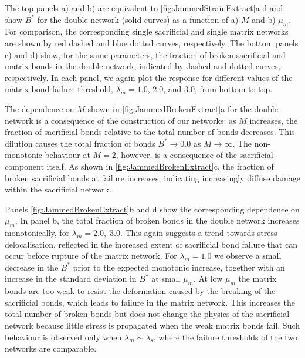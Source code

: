 The top panels a) and b) are equivalent to \cref{fig:JammedStrainExtract}a-d and show $B^*$ for the double network (solid curves) as a function of a) $M$ and b) $\mu_m$. For comparison, the corresponding single sacrificial and single matrix networks are shown by red dashed and blue dotted curves, respectively. The bottom panels c) and d) show, for the same parameters, the fraction of broken sacrificial and matrix bonds in the double network, indicated by dashed and dotted curves, respectively. In each panel, we again plot the response for different values of the matrix bond failure threshold, $\lambda_m=1.0$, $2.0$, and $3.0$, from bottom to top. 

The dependence on $M$ shown in \cref{fig:JammedBrokenExtract}a for the double network is a consequence of the construction of our networks: as $M$ increases, the fraction of sacrificial bonds relative to the total number of bonds decreases. This dilution causes the total fraction of bonds $ B^* \to 0.0$ as $M\to\infty$. The non-monotonic behaviour at $M=2$, however, is a consequence of the sacrificial component itself. As shown in \cref{fig:JammedBrokenExtract}c, the fraction of broken sacrificial bonds at failure increases, indicating increasingly diffuse damage within the sacrificial network.

Panels \cref{fig:JammedBrokenExtract}b and d show the corresponding dependence on $\mu_m$. In panel b, the total fraction of broken bonds in the double network increases monotonically, for $\lambda_m = 2.0, \; 3.0$. This again suggests a trend towards stress delocalisation, reflected in the increased extent of sacrificial bond failure that can occur before rupture of the matrix network. For $\lambda_m =1.0$ we observe a small decrease in the $B^*$ prior to the expected monotonic increase, together with an increase in the standard deviation in $B^*$ at small $\mu_m$. At low $\mu_m$ the matrix bonds are too weak to resist the deformation caused by the breaking of the sacrificial bonds, which leads to failure in the matrix network. This increases the total number of broken bonds but does not change the physics of the sacrificial network because little stress is propagated when the weak matrix bonds fail. Such behaviour is observed only when $\lambda_m \sim \lambda_s$, where the failure thresholds of the two networks are comparable.

